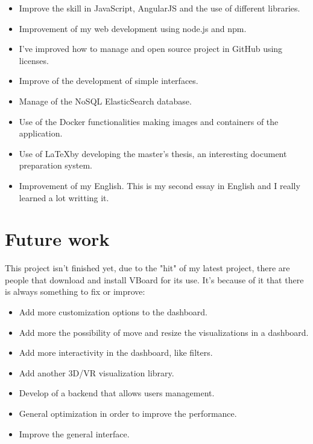\documentclass[a4paper, 12pt]{book}
\begin{document}
\begin{itemize}
\item Improve the skill in JavaScript, AngularJS and the use of different libraries.
\item Improvement of my web development using node.js and npm.
\item I've improved how to manage and open source project in GitHub using licenses.
\item Improve of the development of simple interfaces.
\item Manage of the NoSQL ElasticSearch database.
\item Use of the Docker functionalities making images and containers of the application.
\item Use of \LaTeX  by developing the master's thesis, an interesting document preparation system.
\item Improvement of my English. This is my second essay in English and I really learned a lot writting it.
\end{itemize}

\section{Future work}
\label{sec:fw}

This project isn't finished yet, due to the "hit" of my latest project, there are people that download and install VBoard for its use. It's because of it that there is always something to fix or improve:

\begin{itemize}
\item Add more customization options to the dashboard.
\item Add more the possibility of move and resize the visualizations in a dashboard.
\item Add more interactivity in the dashboard, like filters.
\item Add another 3D/VR visualization library.
\item Develop of a backend that allows users management.
\item General optimization in order to improve the performance.
\item Improve the general interface.
\end{itemize}


\end{document}
